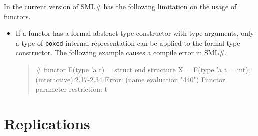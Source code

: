 \documentclass{jbook}
\newcommand{\txt}[2]{#2}
\newcommand{\smlsharp}{SML\#}
\newenvironment{program}{\begin{quote}\begin{tt}}%
                        {\end{tt}\end{quote}}
\begin{document}
	In the current version of \smlsharp{} has the following limitation
on the usage of functors.
\begin{itemize}
\item
	If a functor has a formal abstract type constructor with type
arguments, only a type of {\tt boxed} internal representation can be
applied to the formal type constructor.
	The following example causes a compile error in \smlsharp{}.
\begin{program}
\# functor F(type 'a t) = struct end
   structure X = F(type 'a t = int);
(interactive):2.17-2.34 Error:
  (name evaluation "440") Functor parameter restriction: t
\end{program}
\end{itemize}

\fi%


\section{\txt{リプリケーション宣言}{Replications}}
\label{sec:tutorialReplicationInInterface}
\end{document}

